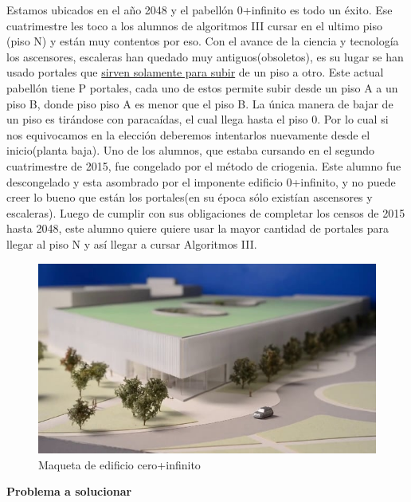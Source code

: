 Estamos ubicados en el año 2048 y el pabellón 0+infinito es todo un éxito. Ese cuatrimestre les toco a los alumnos de algoritmos III cursar en el ultimo piso (piso N) y están muy contentos por eso.\newline
Con el avance de la ciencia y tecnología los ascensores, escaleras han quedado muy antiguos(obsoletos), es su lugar se han usado portales que \underline{sirven solamente para subir} de un piso a otro. \newline 
Este actual pabellón tiene P portales, cada uno de estos permite subir desde un piso A a un piso B, donde piso piso A es menor que el piso B.
La única manera de bajar de un piso es tirándose con paracaídas, el cual llega hasta el piso 0. Por lo cual si nos equivocamos en la elección deberemos intentarlos nuevamente desde el inicio(planta baja).\newline 
Uno de los alumnos, que estaba cursando en el segundo cuatrimestre de 2015, fue congelado por el método de criogenia. Este alumno fue descongelado y esta asombrado por el imponente edificio 0+infinito, y no puede creer lo bueno que están los portales(en su época sólo existían ascensores y escaleras). Luego de cumplir con sus obligaciones de completar los censos de 2015 hasta 2048, este alumno quiere quiere usar la mayor cantidad de portales para llegar al piso N y así llegar a cursar Algoritmos III. \newline

\begin{figure}[H]
  \begin{center}
      \includegraphics[scale=0.50]{imagenes/cero+infinito2.jpg}
  \end{center}
  \caption{Maqueta de edificio cero+infinito}
\end{figure}

\textbf{Problema a solucionar} \newline

